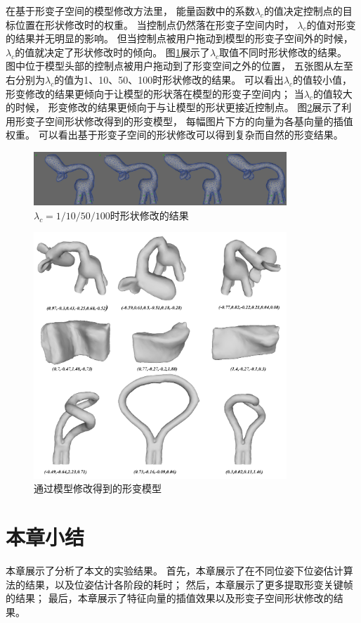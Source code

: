 在基于形变子空间的模型修改方法里，
能量函数中的系数$\lambda_c$的值决定控制点的目标位置在形状修改时的权重。
当控制点仍然落在形变子空间内时，
$\lambda_c$的值对形变的结果并无明显的影响。
但当控制点被用户拖动到模型的形变子空间外的时候，
$\lambda_c$的值就决定了形状修改时的倾向。
图\ref{different_lambda}展示了$\lambda_c$取值不同时形状修改的结果。
图中位于模型头部的控制点被用户拖动到了形变空间之外的位置，
五张图从左至右分别为$\lambda_c$的值为1、10、50、100时形状修改的结果。
可以看出$\lambda_c$的值较小值，
形变修改的结果更倾向于让模型的形状落在模型的形变子空间内；
当$\lambda_c$的值较大的时候，
形变修改的结果更倾向于与让模型的形状更接近控制点。
图\ref{edit_result}展示了利用形变子空间形状修改得到的形变模型，
每幅图片下方的向量为各基向量的插值权重。
可以看出基于形变子空间的形状修改可以得到复杂而自然的形变结果。
\begin{figure}
    \centering
    \includegraphics[width = 0.85\textwidth]{./Pictures/different_lambda.png}
    \caption{$\lambda_c=1/10/50/100$时形状修改的结果}
    \label{different_lambda}
\end{figure}
\begin{figure}
    \centering
    \includegraphics[width = 0.85\textwidth]{./Pictures/edit_result.png}
    \caption{通过模型修改得到的形变模型}
    \label{edit_result}
\end{figure}
\section{本章小结}
本章展示了分析了本文的实验结果。
首先，本章展示了在不同位姿下位姿估计算法的结果，以及位姿估计各阶段的耗时；
然后，本章展示了更多提取形变关键帧的结果；
最后，本章展示了特征向量的插值效果以及形变子空间形状修改的结果。